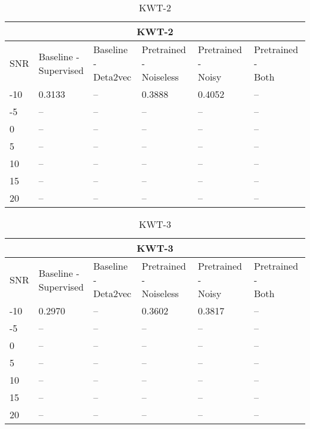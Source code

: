 \begin{table}[ht]
    \centering
    \begin{tabular}{@{}llllll@{}}
        \multicolumn{6}{c}{\textbf{KWT-2}}\\
        \toprule
        SNR    & \makecell{ Baseline - \\ Supervised } & \makecell{ Baseline - \\ Deta2vec } & \makecell{ Pretrained - \\ Noiseless } & \makecell{ Pretrained - \\ Noisy } & \makecell{ Pretrained - \\ Both } \\ \midrule
        -10  & 0.3133 & -- & 0.3888 & 0.4052 & -- \\
        -5   & -- & -- & -- & -- & -- \\
        0    & -- & -- & -- & -- & -- \\
        5    & -- & -- & -- & -- & -- \\
        10   & -- & -- & -- & -- & -- \\
        15   & -- & -- & -- & -- & -- \\
        20   & -- & -- & -- & -- & -- \\
        
        \bottomrule
    \end{tabular}
    \caption{KWT-2}
    \label{tab:KWT-2_snrmix_busxbbl}
\end{table}

\begin{table}[ht]
    \centering
    \begin{tabular}{@{}llllll@{}}
        \multicolumn{6}{c}{\textbf{KWT-3}}\\
        \toprule
        SNR    & \makecell{ Baseline - \\ Supervised } & \makecell{ Baseline - \\ Deta2vec } & \makecell{ Pretrained - \\ Noiseless } & \makecell{ Pretrained - \\ Noisy } & \makecell{ Pretrained - \\ Both } \\ \midrule
        -10  & 0.2970 & -- & 0.3602 & 0.3817 & -- \\
        -5   & -- & -- & -- & -- & -- \\
        0    & -- & -- & -- & -- & -- \\
        5    & -- & -- & -- & -- & -- \\
        10   & -- & -- & -- & -- & -- \\
        15   & -- & -- & -- & -- & -- \\
        20   & -- & -- & -- & -- & -- \\
        
        \bottomrule
    \end{tabular}
    \caption{KWT-3}
    \label{tab:KWT-3_snrmix_busxbbl}
\end{table}


